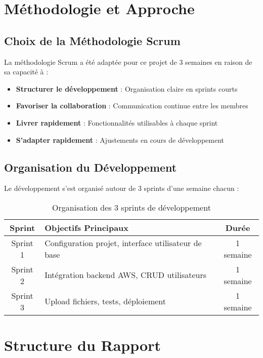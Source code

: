 \section{Méthodologie et Approche}

\subsection{Choix de la Méthodologie Scrum}

La méthodologie Scrum a été adaptée pour ce projet de 3 semaines en raison de sa capacité à :

\begin{itemize}
    \item \textbf{Structurer le développement} : Organisation claire en sprints courts
    \item \textbf{Favoriser la collaboration} : Communication continue entre les membres
    \item \textbf{Livrer rapidement} : Fonctionnalités utilisables à chaque sprint
    \item \textbf{S'adapter rapidement} : Ajustements en cours de développement
\end{itemize}

\subsection{Organisation du Développement}

Le développement s'est organisé autour de 3 sprints d'une semaine chacun :

\begin{table}[H]
    \centering
    \begin{tabularx}{\textwidth}{|c|X|c|}
        \hline
        \textbf{Sprint} & \textbf{Objectifs Principaux} & \textbf{Durée} \\
        \hline
        Sprint 1 & Configuration projet, interface utilisateur de base & 1 semaine \\
        \hline
        Sprint 2 & Intégration backend AWS, CRUD utilisateurs & 1 semaine \\
        \hline
        Sprint 3 & Upload fichiers, tests, déploiement & 1 semaine \\
        \hline
    \end{tabularx}
    \caption{Organisation des 3 sprints de développement}
    \label{tab:sprints_overview}
\end{table}

\section{Structure du Rapport}

